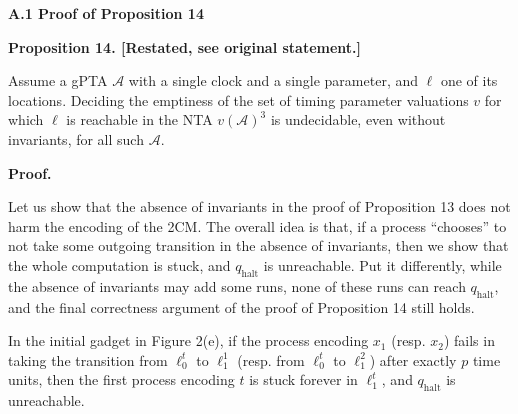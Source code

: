  
\par\medskip\noindent\textbf{A.1 Proof of Proposition 14}\par
 
 
 
\par\medskip\noindent\textbf{Proposition 14. [Restated, see original statement.]}\par
 
 
Assume a gPTA $\mathcal{A}$ with a single clock and a single parameter, and $\mathrm{\ell}$ one of its locations. Deciding the emptiness of the set of timing parameter valuations $v$ for which $\mathrm{\ell}$ is reachable in the NTA ${v(\mathcal{A})}^{3}$ is undecidable, even without invariants, for all such $\mathcal{A}$.\par
 
 
 
 
 
\par\medskip\noindent\textbf{Proof.}\par
 
 
Let us show that the absence of invariants in the proof of Proposition 13 does not harm the encoding of the 2CM. The overall idea is that, if a process “chooses” to not take some outgoing transition in the absence of invariants, then we show that the whole computation is stuck, and $q_{\textrm{halt}}$ is unreachable. Put it differently, while the absence of invariants may add some runs, none of these runs can reach $q_{\textrm{halt}}$, and the final correctness argument of the proof of Proposition 14 still holds.\par
 
 
 
In the initial gadget in Figure 2(e), if the process encoding $x_{1}$ (resp. $x_{2}$) fails in taking the transition from $\mathrm{\mathrm{\ell}}_{0}^{t}$ to $\mathrm{\mathrm{\ell}}_{1}^{1}$ (resp. from $\mathrm{\mathrm{\ell}}_{0}^{t}$ to $\mathrm{\mathrm{\ell}}_{1}^{2}$) after exactly $p$ time units, then the first process encoding $t$ is stuck forever in $\mathrm{\mathrm{\ell}}_{1}^{t}$, and $q_{\textrm{halt}}$ is unreachable.\par
 
